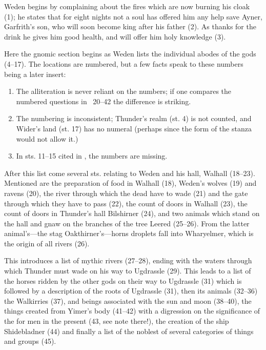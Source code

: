 Weden begins by complaining about the fires which are now burning his cloak (1); he states that for eight nights not a soul has offered him any help save Ayner, Garfrith’s son, who will soon become king after his father (2).  As thanks for the drink he gives him good health, and will offer him holy knowledge (3).

Here the gnomic section begins as Weden lists the individual abodes of the gods (4–17).  The locations are numbered, but a few facts speak to these numbers being a later insert:

\begin{enumerate}
  \item The alliteration is never reliant on the numbers; if one compares the numbered questions in \Vafthrudnismal\ 20–42 the difference is striking.
  \item The numbering is inconsistent; Thunder’s realm (st. 4) is not counted, and Wider’s land (st. 17) has no numeral (perhaps since the form of the stanza would not allow it.)
  \item In sts. 11–15 cited in \Gylfaginning, the numbers are missing.
\end{enumerate}


After this list come several sts. relating to Weden and his hall, Walhall (18–23). Mentioned are the preparation of food in Walhall (18), Weden’s wolves (19) and ravens (20), the river through which the dead have to wade (21) and the gate through which they have to pass (22), the count of doors in Walhall (23), the count of doors in Thunder’s hall Bilshirner (24), and two animals which stand on the hall and gnaw on the branches of the tree Leered (25–26). From the latter animal’s—the stag Oakthirner’s—horns droplets fall into Wharyelmer, which is the origin of all rivers (26).

This introduces a list of mythic rivers (27–28), ending with the waters through which Thunder must wade on his way to Ugdrassle (29). This leads to a list of the horses ridden by the other gods on their way to Ugdrassle (31) which is followed by a description of the roots of Ugdrassle (31), then its animals (32–36) the Walkirries (37), and beings associated with the sun and moon (38–40), the things created from Yimer’s body (41–42) with a digression on the significance of the  for men in the present (43, see note there!), the creation of the ship Shidebladner (44) and finally a list of the noblest of several categories of things and groups (45).

